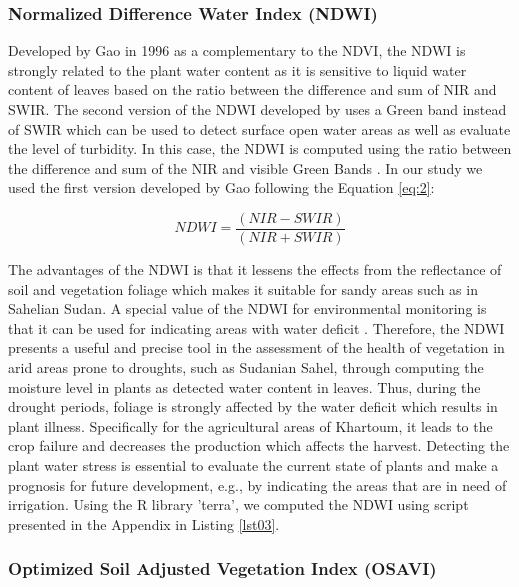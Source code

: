 \documentclass[jimaging,article,submit,pdftex,moreauthors]{Definitions/mdpi}
\begin{document}
\subsubsection{Normalized Difference Water Index (NDWI)}

Developed by Gao in 1996 \cite{GAO1996257} as a complementary to the NDVI, the NDWI is strongly related to the plant water content as it is sensitive to liquid water content of leaves based on the ratio between the difference and sum of NIR and SWIR. The second version of the NDWI developed by \cite{rs5073544} uses a Green band instead of SWIR which can be used to detect surface open water areas as well as evaluate the level of turbidity. In this case, the NDWI is computed using the ratio between the difference and sum of the NIR and visible Green Bands \cite{ZHENG2021129488}. In our study we used the first version developed by Gao following the Equation \ref{eq:2}:

\begin{equation}\label{eq:2}
	NDWI=\dfrac{(NIR-SWIR)}{(NIR+SWIR)}
\end{equation}

The advantages of the NDWI is that it lessens the effects from the reflectance of soil and vegetation foliage which makes it suitable for sandy areas such as in Sahelian Sudan. A special value of the NDWI for environmental monitoring is that it can be used for indicating areas with water deficit \cite{TENG2021107260}. Therefore, the NDWI presents a useful and precise tool in the assessment of the health of vegetation in arid areas prone to droughts, such as Sudanian Sahel, through computing the moisture level in plants as detected water content in leaves. Thus, during the drought periods, foliage is strongly affected by the water deficit which results in plant illness. Specifically for the agricultural areas of Khartoum, it leads to the crop failure and decreases the production which affects the harvest. Detecting the plant water stress is essential to evaluate the current state of plants and make a prognosis for future development, e.g., by indicating the areas that are in need of irrigation. Using the R library 'terra', we computed the NDWI using script presented in the Appendix in Listing \ref{lst03}.

\subsubsection{Optimized Soil Adjusted Vegetation Index (OSAVI)}
\end{document}
